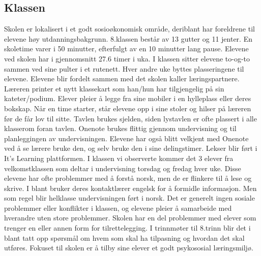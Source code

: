 \documentclass[main.tex]{subfiles}
\begin{document}
\subsection*{Klassen}
Skolen er lokalisert i et godt sosioøkonomisk område, deriblant har foreldrene til elevene høy utdanningsbakgrunn. 8.klassen består av 13 gutter og 11 jenter. En skoletime varer i 50 minutter, efterfulgt av en 10 minutter lang pause. Elevene ved skolen har i gjennomsnitt 27.6 timer i uka. I klassen sitter elevene to-og-to sammen ved sine pulter i et rutenett. Hver andre uke byttes plasseringene til elevene. Elevene blir fordelt sammen med det skolen kaller læringspartnere. Læreren printer et nytt klassekart som han/hun har tilgjengelig på sin kateter/podium. Elever pleier å legge fra sine mobiler i en hylleplass eller deres bokskap. Når en time starter, står elevene opp i sine stoler og hilser på læreren før de får lov til sitte. Tavlen brukes sjelden, siden lystavlen er ofte plassert i alle klasserom foran tavlen. Onenote brukes flittig gjennom undervisning og til planleggingen av undervisningen. Elevene har også blitt velkjent med Onenote ved å se lærere bruke den, og selv bruke den i sine delingstimer. Lekser blir ført i It’s Learning plattformen. I klassen vi observerte kommer det 3 elever fra velkomstklassen som deltar i undervisning torsdag og fredag hver uke. Disse elevene har ofte problemmer med å forstå norsk, men de er flinkere til å lese og skrive. I blant bruker deres kontaktlærer engelsk for å formidle informasjon. Men som regel blir helklasse undervisningen ført i norsk. Det er generelt ingen sosiale problemmer eller konflikter i klassen, og elevene pleier å samarbeide med hverandre uten store problemmer. Skolen har en del problemmer med elever som trenger en eller annen form for tilrettelegging. I trinnmøter til 8.trinn blir det i blant tatt opp spørsmål om hvem som skal ha tilpasning og hvordan det skal utføres. Fokuset til skolen er å tilby sine elever et godt psykososial læringsmiljø.
\newpage\null
\end{document}
